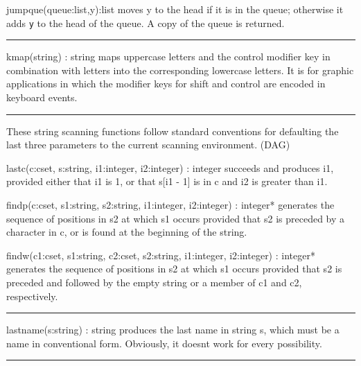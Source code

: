 \textsf{jumpque(}\textsf{queue}\textsf{:list,y):list} moves
\textsf{y} to the head if it is in the queue; otherwise it adds
\texttt{y} to the head of the queue. A copy of the queue is returned.


\vspace{0.25cm}\hrule{}

\textsf{kmap(string) : string} maps uppercase letters and the control
modifier key in combination with letters into the corresponding
lowercase letters. It is for graphic applications in which the modifier
keys for shift and control are encoded in keyboard
events. 

\vspace{0.25cm}\hrule{}

These string scanning functions follow standard conventions for
defaulting the last three parameters to the current scanning
environment. (DAG)

\textsf{lastc(c:cset, s:string, i1:integer, i2:integer) : integer}
succeeds and produces \textsf{i1}, provided either that \textsf{i1} is
\textsf{1}, or that \textsf{s[i1 - 1]} is in \textsf{c} and \textsf{i2}
is greater than \textsf{i1}.

\textsf{findp(c:cset, s1:string, s2:string, i1:integer, i2:integer) :
integer*} generates the sequence of positions in \textsf{s2} at which
\textsf{s1} occurs provided that \textsf{s2} is preceded by a character
in \textsf{c}, or is found at the beginning of the string.

\textsf{findw(c1:cset, s1:string, c2:cset, s2:string, i1:integer,
i2:integer) : integer*} generates the sequence of positions in
\textsf{s2} at which \textsf{s1} occurs provided that \textsf{s2} is
preceded and followed by the empty string or a member of \textsf{c1}
and \textsf{c2, respectively}.

\vspace{0.25cm}\hrule{}

\textsf{lastname(s:string) : string} produces the last name in string
\textsf{s}, which must be a name in conventional form. Obviously, it
doesn{\textquotesingle}t work for every possibility. 

\vspace{0.25cm}\hrule{}

